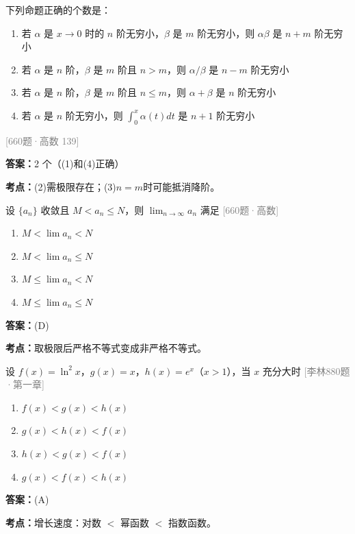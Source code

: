 \documentclass[12pt,a4paper]{ctexbook}
\newcommand{\src}[1]{\hfill\textcolor{gray}{\small\textsf{[#1]}}}
\newcommand{\ans}[1]{\begin{answerbox}\textbf{答案：}#1\end{answerbox}}
\newcommand{\kpt}[1]{\textbf{考点：}#1}
\begin{document}
\bigskip

\begin{exercise}[660题·无穷小的阶·139题]
下列命题正确的个数是：
\begin{enumerate}[label=(\arabic*),nosep]
  \item 若 $\alpha$ 是 $x\to 0$ 时的 $n$ 阶无穷小，$\beta$ 是 $m$ 阶无穷小，则 $\alpha\beta$ 是 $n+m$ 阶无穷小
  \item 若 $\alpha$ 是 $n$ 阶，$\beta$ 是 $m$ 阶且 $n>m$，则 $\alpha/\beta$ 是 $n-m$ 阶无穷小
  \item 若 $\alpha$ 是 $n$ 阶，$\beta$ 是 $m$ 阶且 $n\leqslant m$，则 $\alpha+\beta$ 是 $n$ 阶无穷小
  \item 若 $\alpha$ 是 $n$ 阶无穷小，则 $\int_0^x\alpha(t)dt$ 是 $n+1$ 阶无穷小
\end{enumerate}
\src{660题·高数 139}
\end{exercise}
\ans{2 个（(1)和(4)正确）}
\kpt{(2)需极限存在；(3)$n=m$时可能抵消降阶。}

\bigskip

\begin{exercise}[660题·极限保号性与数列不等式]
设 $\{a_n\}$ 收敛且 $M<a_n\leqslant N$，则 $\lim_{n\to\infty}a_n$ 满足 \hfill\src{660题·高数}
\begin{enumerate}[label=(\Alph*),nosep]
  \item $M<\lim a_n<N$
  \item $M<\lim a_n\leqslant N$
  \item $M\leqslant\lim a_n<N$
  \item $M\leqslant\lim a_n\leqslant N$
\end{enumerate}
\end{exercise}
\ans{(D)}
\kpt{取极限后严格不等式变成非严格不等式。}

\bigskip

\begin{exercise}[880题·无穷大增长速度比较]
设 $f(x)=\ln^2x$，$g(x)=x$，$h(x)=e^x$（$x>1$），当 $x$ 充分大时 \hfill\src{李林880题·第一章}
\begin{enumerate}[label=(\Alph*),nosep]
  \item $f(x)<g(x)<h(x)$
  \item $g(x)<h(x)<f(x)$
  \item $h(x)<g(x)<f(x)$
  \item $g(x)<f(x)<h(x)$
\end{enumerate}
\end{exercise}
\ans{(A)}
\kpt{增长速度：对数 $<$ 幂函数 $<$ 指数函数。}
\end{document}
